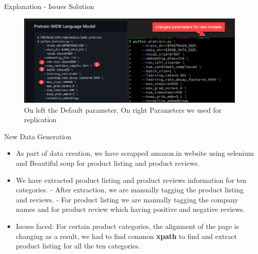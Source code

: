 \documentclass[aspectratio=169,xcolor=dvipsnames]{beamer}
\begin{document}
\begin{frame}{Explanation - Issues Solution}
    \tableofcontents


  \begin{figure}
   \includegraphics[width=420]{new_model_1.png}
      \caption{On left the Default parameter, On right Parameters we used for replication}
\end{figure}


\end{frame}


\begin{frame}{New Data Generation}
    \begin{itemize}
        \item As part of data creation, we have scrapped amazon.in website using selenium and Beautiful soup for product listing and product reviews.
        \item We have extracted product listing and product reviews information for ten categories. \break 
            - After extraction, we are manually tagging the product listing and reviews. \break
            - For product listing we are manually tagging the company names and for product review which having positive and negative reviews.\break  
     \item \alert{Issues faced:} For certain product categories, the alignment of the page is changing as a result, we had to find common \textbf{xpath} to find and extract product listing for all the ten categories.
        \newline
        \newline

    \end{itemize}
\end{frame}
\end{document}
